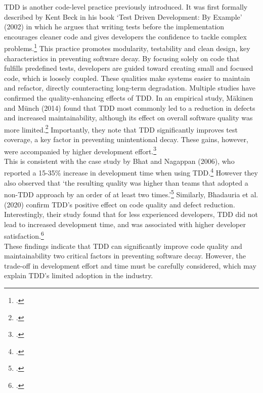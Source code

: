 \ac{TDD} is another code-level practice previously introduced. It was first formally described by Kent Beck in his book
`Test Driven Development: By Example' (2002) in which he argues that writing tests before the implementation
encourages cleaner code and gives developers the confidence to tackle complex problems.\footcite[pp. 8-9]{beckTestdrivenDevelopmentExample2002}
This practice promotes modularity, testability and clean design, key characteristics in preventing software decay. By focusing solely on code
that fulfills predefined tests, developers are guided toward creating small and focused code, which is loosely coupled. These qualities make systems
easier to maintain and refactor, directly counteracting long-term degradation.
Multiple studies have confirmed the quality-enhancing effects of \ac{TDD}.
In an empirical study, Mäkinen and Münch (2014) found that  TDD most commonly led to a reduction in defects and increased maintainability, 
although its effect on overall software quality was more limited.\footcite[13]{inproceedings}
Importantly, they note that TDD significantly improves test coverage, a key factor in preventing unintentional decay.
These gains, however, were accompanied by higher development effort.\footcite[13]{inproceedings}\\
This is consistent with the case study by Bhat and Nagappan (2006), who reported a 15-35\% increase in development time when using \ac{TDD}.\footcite[361]{bhatEvaluatingEfficacyTestdriven2006a}
However they also observed that `the resulting quality was higher than teams that adopted a non-TDD approach by an order of at least two times.'\footcite[361]{bhatEvaluatingEfficacyTestdriven2006a}
Similarly, Bhadauria et al. (2020) confirm TDD’s positive effect on code quality and defect reduction.
Interestingly, their study found that for less experienced developers, TDD did not lead to increased development time, and was associated with higher developer satisfaction.\footcite[1058]{bhadauriaPerformanceOutcomesTestDriven2020}\\
These findings indicate that TDD can significantly improve code quality and maintainability two critical factors in preventing software decay.
However, the trade-off in development effort and time must be carefully considered, which may explain TDD's limited adoption in the industry.\\


